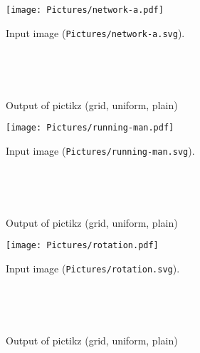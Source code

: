 \documentclass{article}
\begin{document}
\begin{figure}[H]
 \centering
 \texttt{[image: Pictures/network-a.pdf]}
 \caption{Input image (\texttt{Pictures/network-a.svg}).}
 \end{figure}

 \begin{figure}[H]
 \centering
 \begin{tikzpicture}[scale=1.5]
 
 \end{tikzpicture}~
 \begin{tikzpicture}[scale=1.5]
 
 \end{tikzpicture}~
 \begin{tikzpicture}[scale=1.5]
 
 \end{tikzpicture}
 \caption{Output of pictikz (grid, uniform, plain)}
 \end{figure}\clearpage

\begin{figure}[H]
 \centering
 \texttt{[image: Pictures/running-man.pdf]}
 \caption{Input image (\texttt{Pictures/running-man.svg}).}
 \end{figure}

 \begin{figure}[H]
 \centering
 \begin{tikzpicture}[scale=1.5]
 
 \end{tikzpicture}~
 \begin{tikzpicture}[scale=1.5]
 
 \end{tikzpicture}~
 \begin{tikzpicture}[scale=1.5]
 
 \end{tikzpicture}
 \caption{Output of pictikz (grid, uniform, plain)}
 \end{figure}\clearpage

\begin{figure}[H]
 \centering
 \texttt{[image: Pictures/rotation.pdf]}
 \caption{Input image (\texttt{Pictures/rotation.svg}).}
 \end{figure}

 \begin{figure}[H]
 \centering
 \begin{tikzpicture}[scale=1.5]
 
 \end{tikzpicture}~
 \begin{tikzpicture}[scale=1.5]
 
 \end{tikzpicture}~
 \begin{tikzpicture}[scale=1.5]
 
 \end{tikzpicture}
 \caption{Output of pictikz (grid, uniform, plain)}
 \end{figure}\clearpage
\end{document}
